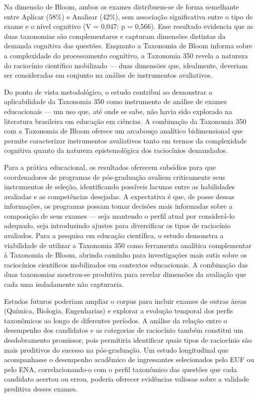 \documentclass[
  12pt,
  a4paper,
  twoside,
  brazilian
]{article}
\begin{document}
Na dimensão de Bloom, ambos os exames distribuem-se de forma semelhante
entre Aplicar (58\%) e Analisar (42\%), sem associação significativa
entre o tipo de exame e o nível cognitivo (V = 0,047; p = 0,566). Esse
resultado evidencia que as duas taxonomias são complementares e capturam
dimensões distintas da demanda cognitiva das questões. Enquanto a
Taxonomia de Bloom informa sobre a complexidade do processamento
cognitivo, a Taxonomia 350 revela a natureza do raciocínio científico
mobilizado --- duas dimensões que, idealmente, deveriam ser consideradas
em conjunto na análise de instrumentos avaliativos.

Do ponto de vista metodológico, o estudo contribui ao demonstrar a
aplicabilidade da Taxonomia 350 como instrumento de análise de exames
educacionais --- um uso que, até onde se sabe, não havia sido explorado
na literatura brasileira em educação em ciências. A combinação da
Taxonomia 350 com a Taxonomia de Bloom oferece um arcabouço analítico
bidimensional que permite caracterizar instrumentos avaliativos tanto em
termos da complexidade cognitiva quanto da natureza epistemológica dos
raciocínios demandados.

Para a prática educacional, os resultados oferecem subsídios para que
coordenadores de programas de pós-graduação avaliem criticamente seus
instrumentos de seleção, identificando possíveis lacunas entre as
habilidades avaliadas e as competências desejadas. A expectativa é que,
de posse dessas informações, os programas possam tomar decisões mais
informadas sobre a composição de seus exames --- seja mantendo o perfil
atual por considerá-lo adequado, seja introduzindo ajustes para
diversificar os tipos de raciocínio avaliados. Para a pesquisa em
educação científica, o estudo demonstra a viabilidade de utilizar a
Taxonomia 350 como ferramenta analítica complementar à Taxonomia de
Bloom, abrindo caminho para investigações mais sutis sobre os
raciocínios científicos mobilizados em contextos educacionais. A
combinação das duas taxonomias mostrou-se produtiva para revelar
dimensões da avaliação que cada uma isoladamente não capturaria.

Estudos futuros poderiam ampliar o corpus para incluir exames de outras
áreas (Química, Biologia, Engenharias) e explorar a evolução temporal
dos perfis taxonômicos ao longo de diferentes períodos. A análise da
relação entre o desempenho dos candidatos e as categorias de raciocínio
também constitui um desdobramento promissor, pois permitiria identificar
quais tipos de raciocínio são mais preditivos do sucesso na
pós-graduação. Um estudo longitudinal que acompanhasse o desempenho
acadêmico de ingressantes selecionados pelo EUF ou pelo ENA,
correlacionando-o com o perfil taxonômico das questões que cada
candidato acertou ou errou, poderia oferecer evidências valiosas sobre a
validade preditiva desses exames.
\end{document}
